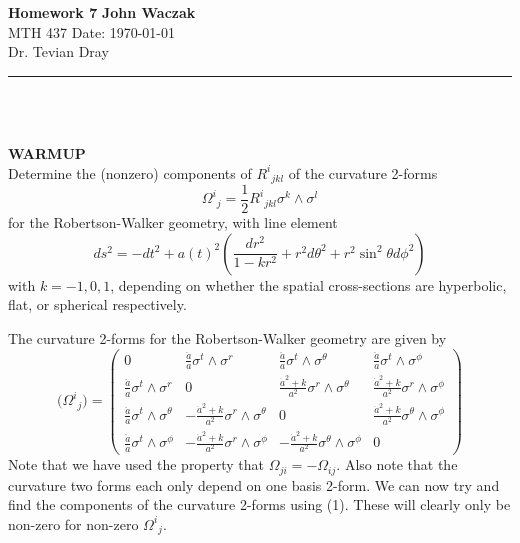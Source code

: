 \documentclass[a4paper, 11pt]{article}
\newenvironment{solution}{%
	\begin{list}{}{%
			\setlength{\topsep}{0pt}%
			\setlength{\leftmargin}{0.5cm}%
			\setlength{\rightmargin}{0.5cm}%
			\setlength{\listparindent}{\parindent}%
			\setlength{\itemindent}{\parindent}%
			\setlength{\parsep}{\parskip}%
		}%
		\item[]}{\end{list}}
\begin{document}
\noindent
\large\textbf{Homework 7} \hfill \textbf{John Waczak} \\
\normalsize MTH 437 \hfill  Date: \today \\
Dr. Tevian Dray %
\par\noindent\rule{\textwidth}{0.4pt} \\\\


\begin{enumerate}[leftmargin=0em, label=\textbf{\arabic*}.]
  \setcounter{enumi}{-1}
  \item \textbf{WARMUP}\\
    Determine the (nonzero) components of $R^i{}_{jkl}$ of the curvature 2-forms
    \begin{equation}
      \Omega^i{}_j = \frac{1}{2}R^i{}_{jkl}\sigma^k\wedge\sigma^l
    \end{equation}
    for the Robertson-Walker geometry, with line element
    \begin{equation}
      ds^2 = -dt^2+a(t)^2\left( \frac{dr^2}{1-kr^2}+r^2d\theta^2+r^2\sin^2\theta d\phi^2 \right)
    \end{equation}
    with $k= -1, 0, 1$, depending on whether the spatial cross-sections are
    hyperbolic, flat, or spherical respectively.
    \begin{solution}
      The curvature 2-forms for the Robertson-Walker geometry are given by
      \begin{equation}
        \Big(\Omega^i{}_j\Big) = \begin{pmatrix}
          0 & \frac{\ddot{a}}{a}\sigma^t\wedge \sigma^r & \frac{\ddot{a}}{a}\sigma^t\wedge \sigma^{\theta} & \frac{\ddot{a}}{a}\sigma^t\wedge \sigma^{\phi} \\
          \frac{\ddot{a}}{a}\sigma^t\wedge\sigma^r & 0 & \frac{\dot{a}^2+k}{a^2}\sigma^r\wedge\sigma^{\theta} & \frac{\dot{a}^2+k}{a^2}\sigma^r\wedge\sigma^{\phi} \\
          \frac{\ddot{a}}{a}\sigma^t\wedge\sigma^\theta & -\frac{\dot{a}^2+k}{a^2}\sigma^r\wedge\sigma^{\theta} & 0 & \frac{\dot{a}^2+k}{a^2}\sigma^\theta\wedge\sigma^{\phi} \\
          \frac{\ddot{a}}{a}\sigma^t\wedge \sigma^{\phi} & -\frac{\dot{a}^2+k}{a^2}\sigma^r\wedge\sigma^{\phi} &  -\frac{\dot{a}^2+k}{a^2}\sigma^\theta\wedge\sigma^{\phi}& 0
          \end{pmatrix}
      \end{equation}
      Note that we have used the property that $\Omega_{ji} = -\Omega_{ij}$.
      Also note that the curvature two forms each only depend on one basis
      2-form. We can now try and find the components of the curvature 2-forms
      using (1). These will clearly only be non-zero for non-zero
      $\Omega^i{}_j$. \\


\end{solution}
\end{enumerate}
\end{document}
